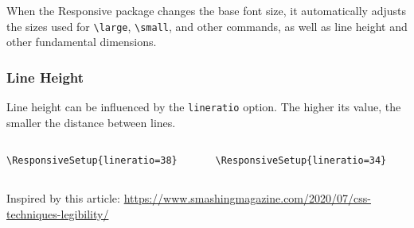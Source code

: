 When the Responsive package changes the base font size, it automatically
adjusts the sizes used for \verb|\large|, \verb|\small|, and other commands, as well as line
height and other fundamental dimensions.


\begin{frame}[fragile]
  \frametitle{Line Height}
  Line height can be influenced by the \texttt{lineratio} option. 
The higher its value, the smaller the distance between lines.

\begin{columns}
  \begin{column}{0.5\textwidth}
\begin{verbatim}
\ResponsiveSetup{lineratio=38}
\end{verbatim}

\end{column}
  \begin{column}{0.5\textwidth}
\begin{verbatim}
\ResponsiveSetup{lineratio=34}
\end{verbatim}

\end{column}
\end{columns}

\begin{block}{Inspired by this article:}
\url{https://www.smashingmagazine.com/2020/07/css-techniques-legibility/}
\end{block}

\end{frame}


